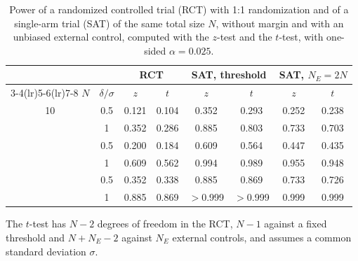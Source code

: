 \begin{table}[!htb]
\centering
\caption{Power of a randomized controlled trial (RCT) with 1:1 randomization and of a single-arm trial (SAT) of the same total size $N$, without margin and with an unbiased external control, computed with the $z$-test and the $t$-test, with one-sided $\alpha = 0.025$.}
\label{tab:z_t}
\begin{tabular}{cccccccc}
\toprule
 & & \multicolumn{2}{c}{RCT} & \multicolumn{2}{c}{SAT, threshold} & \multicolumn{2}{c}{SAT, $N_E = 2N$} \\
\cmidrule(lr){3-4}\cmidrule(lr){5-6}\cmidrule(lr){7-8}
$N$ & $\delta/\sigma$ & $z$ & $t$ & $z$ & $t$ & $z$ & $t$ \\
\midrule
10 & 0.5 & 0.121 & 0.104 & 0.352 & 0.293 & 0.252 & 0.238 \\
 & 1 & 0.352 & 0.286 & 0.885 & 0.803 & 0.733 & 0.703 \\
\addlinespace
20 & 0.5 & 0.200 & 0.184 & 0.609 & 0.564 & 0.447 & 0.435 \\
 & 1 & 0.609 & 0.562 & 0.994 & 0.989 & 0.955 & 0.948 \\
\addlinespace
40 & 0.5 & 0.352 & 0.338 & 0.885 & 0.869 & 0.733 & 0.726 \\
 & 1 & 0.885 & 0.869 & $>$0.999 & $>$0.999 & 0.999 & 0.999 \\
\bottomrule
\end{tabular}
\par\smallskip
\begin{minipage}{0.95\linewidth}
\footnotesize
The $t$-test has $N - 2$ degrees of freedom in the RCT, $N - 1$ against a fixed threshold and $N + N_E - 2$ against $N_E$ external controls, and assumes a common standard deviation $\sigma$.
\end{minipage}
\end{table}
